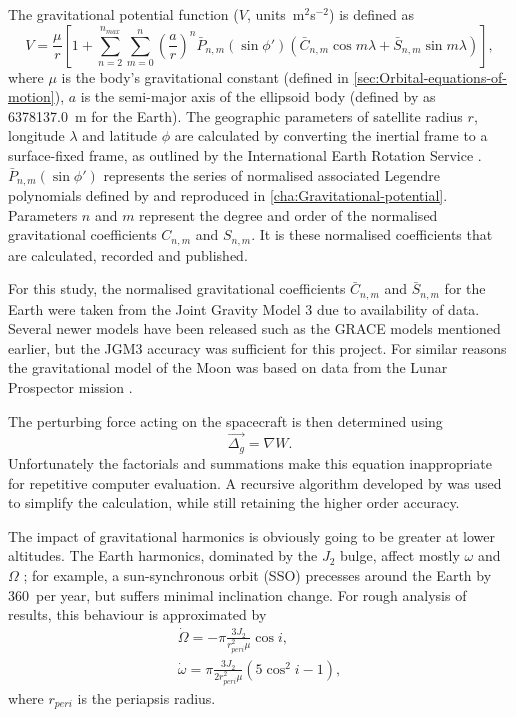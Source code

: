 The gravitational potential function ($V$, units~m$^{2}$s$^{-2}$) is defined as 
\begin{equation} \label{eq:Grav-Potential}
V=\frac{\mu}{r}\left[1+\sum_{n=2}^{n_{max}}\sum_{m=0}^{n}\left(\frac{a}{r}\right)^{n}\bar{P}_{n,m}(\sin\phi')(\bar{C}_{n,m}\cos m\lambda+\bar{S}_{n,m}\sin m\lambda)\right],
\end{equation}
where $\mu$ is the body's gravitational constant (defined in \autoref{sec:Orbital-equations-of-motion}), $a$ is the semi-major axis of the ellipsoid body (defined by \citeauthor{WGS84} as 6378137.0~m for the Earth). The geographic parameters of satellite radius $r$, longitude $\lambda$ and latitude $\phi$ are calculated by converting the inertial frame to a surface-fixed frame, as outlined by the International Earth Rotation Service \parencite{Petit2010}. $\bar{P}_{n,m}\left(\sin\phi'\right)$ represents the series of normalised associated Legendre polynomials defined by \textcite{WGS84} and reproduced in \autoref{cha:Gravitational-potential}. Parameters $n$ and $m$ represent the degree and order of the normalised gravitational coefficients $C_{n,m}$ and $S_{n,m}$. It is these normalised coefficients that are calculated, recorded and published. 

For this study, the normalised gravitational coefficients $\bar{C}_{n,m}$ and $\bar{S}_{n,m}$ for the Earth were taken from the Joint Gravity Model 3 \parencite[JGM3,][]{Tapley1996} due to availability of data. Several newer models have been released such as the GRACE models mentioned earlier, but the JGM3 accuracy was sufficient for this project. For similar reasons the gravitational model of the Moon was based on data from the Lunar Prospector mission \parencite[LP165, ][]{Konopliv2001}.

The perturbing force acting on the spacecraft is then determined using
\begin{equation}\label{eq:Oblateness-perturbation}
\vec{\Delta_g}=\nabla W.
\end{equation}
Unfortunately the factorials and summations make this equation inappropriate for repetitive computer evaluation. A recursive algorithm developed by \textcite{Montenbruck2000} was used to simplify the calculation, while still retaining the higher order accuracy. 

The impact of gravitational harmonics is obviously going to be greater at lower altitudes. The Earth harmonics, dominated by the $J_2$ bulge, affect mostly $\omega$ and $\Omega$ \parencite{Montenbruck2000,Eshagh2007}; for example, a sun-synchronous orbit (SSO) precesses around the Earth by 360\degrees\ per year, but suffers minimal inclination change. For rough analysis of results, this behaviour is approximated by
\begin{subequations}\label{eq:Precession}
\begin{gather}
\dot\Omega = -\pi\frac{3J_2}{r_{peri}^2\mu}\cos i, \\
\dot\omega = \pi\frac{3J_2}{2r_{peri}^2\mu}(5\cos^2i-1),
\end{gather}
\end{subequations}
where $r_{peri}$ is the periapsis radius.



